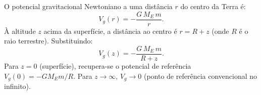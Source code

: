 O potencial gravitacional Newtoniano a uma distância $r$ do centro da Terra é:
\[
V_g(r) = -\frac{G\,M_E\,m}{r}.
\]
À altitude $z$ acima da superfície, a distância ao centro é $r = R + z$ (onde $R$ é o raio terrestre). Substituindo:
\[
\boxed{V_g(z) = -\frac{G\,M_E\,m}{R+z}.}
\]
Para $z = 0$ (superfície), recupera-se o potencial de referência $V_g(0) = -GM_Em/R$. Para $z\to\infty$, $V_g \to 0$ (ponto de referência convencional no infinito).